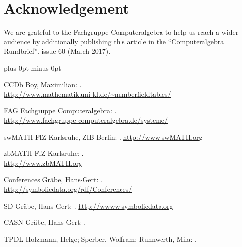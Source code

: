 \documentclass[12pt]{article}
\begin{document}
\section*{Acknowledgement}
We are grateful to the Fachgruppe Computeralgebra to help us reach a
wider audience by additionally publishing this article in the
``Computeralgebra Rundbrief'', issue 60 (March 2017).


\begin{thebibliography}{19}
\itemsep=0cm plus 0pt minus 0pt



\bibitem
{CCDb}
Boy, Maximilian:
.\\
\newblock \url{http://www.mathematik.uni-kl.de/~numberfieldtables/}

\bibitem
{FAG}
Fachgruppe Computeralgebra:
.\\
\newblock \url{http://www.fachgruppe-computeralgebra.de/systeme/}

\bibitem
{swMATH}
FIZ Karlsruhe, ZIB Berlin:
.
\newblock \url{http://www.swMATH.org}

\bibitem
{zbMATH}
FIZ Karlsruhe:
.\\
\newblock \url{http://www.zbMATH.org}

\bibitem
{Conferences}
Gr\"abe, Hans-Gert:
.\\
\newblock \url{http://symbolicdata.org/rdf/Conferences/}


\bibitem
{SD}
Gr\"abe, Hans-Gert:
.
\newblock \url{http://wwww.symbolicdata.org}

\bibitem
{CASN}
Gr\"abe, Hans-Gert:
.

\bibitem
{TPDL}
Holzmann, Helge; Sperber, Wolfram; Runnwerth, Mila:
.


\end{thebibliography}
\end{document}
